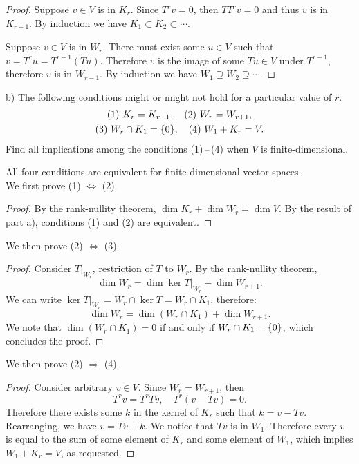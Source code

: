 \documentclass{article}
\theoremstyle{definition}
\DeclarePairedDelimiter\set{\{}{\}}
\newcommand{\restrict}[1]{ \big|_{#1} }
\begin{document}
\begin{proof}

Suppose $v \in V$ is in $K_r$.
Since $T^r v = 0$, then $TT^r v = 0$ and thus $v$ is in $K_{r+1}$.
By induction we have $K_1 \subset K_2 \subset \cdots$.

Suppose $v \in V$ is in $W_r$.
There must exist some $u \in V$ such that $v = T^r u = T^{r-1} (Tu)$.
Therefore $v$ is the image of some $Tu \in V$ under $T^{r-1}$, therefore $v$ is in $W_{r-1}$.
By induction we have $W_1 \supseteq W_2 \supseteq \cdots$.

\end{proof}

\begin{tcolorbox}
b) The following conditions might or might not hold for a particular value of $r$.
\begin{gather*}
    \text{(1) } K_r = K_{r+1}, \quad 
    \text{(2) } W_r = W_{r+1}, \\
    \text{(3) } W_r \cap K_1 = \set{0}, \quad
    \text{(4) } W_1 + K_r = V.
\end{gather*}
Find all implications among the conditions (1)\,--\,(4) when $V$ is finite-dimensional.
\end{tcolorbox}

All four conditions are equivalent for finite-dimensional vector spaces.
\\

We first prove (1) $\iff$ (2).

\begin{proof}
By the rank-nullity theorem, $\dim K_r + \dim W_r = \dim V$.
By the result of part a), conditions (1) and (2) are equivalent.
\end{proof}

We then prove (2) $\iff$ (3).

\begin{proof}
Consider $T\restrict{W_r}$, restriction of $T$ to $W_r$.
By the rank-nullity theorem,
\[ \dim W_{r} = \dim \ker T\restrict{W_r} + \dim W_{r+1}. \]
We can write $\ker T\restrict{W_r} = W_r \cap \ker T = W_r \cap K_1$, therefore:
\[ \dim W_{r} = \dim (W_r \cap K_1) + \dim W_{r+1}. \]
We note that $\dim (W_r \cap K_1) = 0$ if and only if $W_r \cap K_1 = \set{0}$, which concludes the proof.
\end{proof}

We then prove (2) $\Longrightarrow$ (4).

\begin{proof}
Consider arbitrary $v \in V$.
Since $W_r = W_{r+1}$, then
\[ T^r v = T^r Tv, \quad T^r (v - Tv) = 0. \]
Therefore there exists some $k$ in the kernel of $K_r$ such that $k = v-Tv$.
Rearranging, we have $v = Tv + k$.
We notice that $Tv$ is in $W_1$.
Therefore every $v$ is equal to the sum of some element of $K_r$ and some element of $W_1$, which implies $W_1 + K_r = V$, as requested.
\end{proof}
\end{document}
